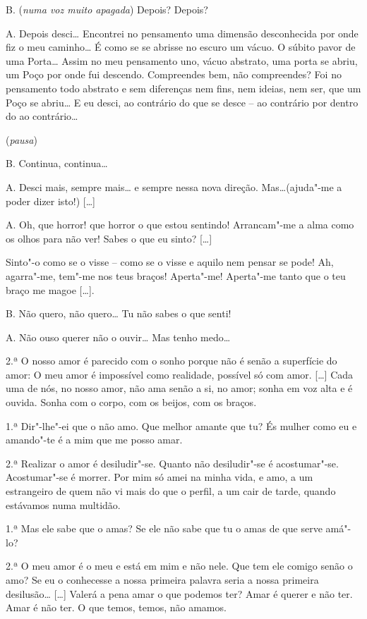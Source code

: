 \textsc{B.} (\textit{numa voz muito apagada}) Depois? Depois?

\textsc{A.} Depois desci\ldots{} Encontrei no pensamento uma dimensão desconhecida
por onde fiz o meu caminho\ldots{} É como se se abrisse no escuro um vácuo.
O súbito pavor de uma Porta\ldots{} Assim no meu pensamento uno, vácuo
abstrato, uma porta se abriu, um Poço por onde fui descendo.
Compreendes bem, não compreendes? Foi no pensamento todo abstrato e
sem diferenças nem fins, nem ideias, nem ser, que um Poço se abriu\ldots{} E
eu desci, ao contrário do que se desce -- ao contrário por dentro do
ao contrário\ldots{}

\hfill(\textit{pausa})

\textsc{B.} Continua, continua\ldots{}

\textsc{A.} Desci mais, sempre mais\ldots{} e sempre nessa nova direção.
Mas\ldots{}(ajuda"-me a poder dizer isto!) [\ldots{}]

\textsc{A.} Oh, que horror! que horror o que estou sentindo! Arrancam"-me a alma
como os olhos para não ver! Sabes o que eu sinto? [\ldots{}]

Sinto"-o como se o visse -- como se o visse e aquilo nem pensar se pode!
Ah, agarra"-me, tem"-me nos teus braços! Aperta"-me! Aperta"-me tanto que
o teu braço me magoe [\ldots{}].

\textsc{B.} Não quero, não quero\ldots{} Tu não sabes o que senti!

\textsc{A.} Não ouso querer não o ouvir\ldots{} Mas tenho medo\ldots{}

\textsc{2.ª} O nosso amor é parecido com o sonho porque não é senão a
superfície do amor: O meu amor é impossível como realidade, possível
só com amor. [\ldots{}] Cada uma de nós, no nosso amor, não ama senão a si,
no amor; sonha em voz alta e é ouvida. Sonha com o corpo, com os
beijos, com os braços.

\textsc{1.ª} Dir"-lhe"-ei que o não amo. Que melhor amante que tu? És mulher como
eu e amando"-te é a mim que me posso amar.

\textsc{2.ª} Realizar o amor é desiludir"-se. Quanto não desiludir"-se é
acostumar"-se. Acostumar"-se é morrer. Por mim só amei na minha vida, e
amo, a um estrangeiro de quem não vi mais do que o perfil, a um cair
de tarde, quando estávamos numa multidão.

\textsc{1.ª} Mas ele sabe que o amas? Se ele não sabe que tu o amas de que
serve amá"-lo? 

\textsc{2.ª} O meu amor é o meu e está em mim e não nele. Que tem ele comigo
senão o amo? Se eu o conhecesse a nossa primeira palavra seria a
nossa primeira desilusão\ldots{} [\ldots{}] Valerá a pena amar o que podemos
ter? Amar é querer e não ter. Amar é não ter. O que temos, temos, não
amamos.

